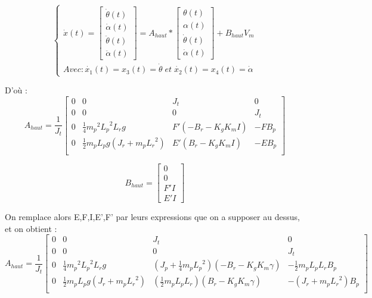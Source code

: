 \documentclass[12pt, a4paper, openany]{report}
\begin{document}
\begin{equation*}
\left\{\begin{matrix}
\dot{x}(t) = \begin{bmatrix}
\dot{\theta}(t)\\ 
\dot{\alpha}(t)\\ 
\ddot{\theta}(t)\\ 
\ddot{\alpha}(t)
\end{bmatrix} = A_{haut}*\begin{bmatrix}
\theta(t)\\ 
\alpha(t)\\ 
\dot{\theta}(t)\\ 
\dot{\alpha}(t)
\end{bmatrix} + B_{haut} V_m\\ 

Avec : \dot{x_1}(t) = x_3(t) = \dot{\theta}\; et \; \dot{x_2}(t) = x_4(t) = \dot{\alpha}
\end{matrix}\right.
\end{equation*}

D’où : 
\begin{equation*}
    A_{haut} = \frac{1}{J_t} \begin{bmatrix}
0 & 0 & J_t & 0\\
0 & 0 & 0 & J_t\\
0 & \frac{1}{4}{m_p}^2{L_p}^2L_rg & F'(-B_r-K_gK_mI)& -FB_p \\
0 & \frac{1}{2}m_pL_pg(J_r+m_p{L_r}^2) & E'(B_r-K_gK_mI) & -EB_p\\
\end{bmatrix}
\end{equation*}

\begin{equation*}
    B_{haut} = \begin{bmatrix}
    0\\ 
    0\\ 
    F'I\\ 
    E'I
\end{bmatrix}
\end{equation*}

On remplace alors E,F,I,E',F' par leurs expressions que on a supposer au dessus, et on obtient : 
\begin{equation*}
    A_{haut} = \frac{1}{J_t} \begin{bmatrix}
0 & 0 & J_t & 0\\
0 & 0 & 0 & J_t\\
0 & \frac{1}{4}{m_p}^2{L_p}^2L_rg & (J_p+\frac{1}{4}m_p{L_p}^2)(-B_r-K_gK_m\gamma)& -\frac{1}{2}m_pL_pL_rB_p \\
0 & \frac{1}{2}m_pL_pg(J_r+m_p{L_r}^2) & (\frac{1}{2}m_pL_pL_r)(B_r-K_gK_m\gamma) & -(J_r+m_p{L_r}^2)B_p\\
\end{bmatrix}
\end{equation*}
\end{document}

